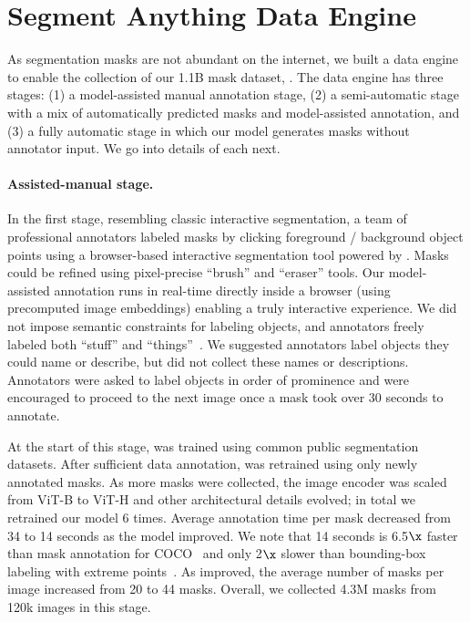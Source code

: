 \section{Segment Anything Data Engine}\label{sec:engine}

As segmentation masks are not abundant on the internet, we built a data engine to enable the collection of our 1.1B mask dataset, \sad. The data engine has three stages: (1) a model-assisted manual annotation stage, (2) a semi-automatic stage with a mix of automatically predicted masks and model-assisted annotation, and (3) a fully automatic stage in which our model generates masks without annotator input. We go into details of each next.

\paragraph{Assisted-manual stage.} In the first stage, resembling classic interactive segmentation, a team of professional annotators labeled masks by clicking foreground / background object points using a browser-based interactive segmentation tool powered by \sam. Masks could be refined using pixel-precise ``brush'' and ``eraser'' tools. Our model-assisted annotation runs in real-time directly inside a browser (using precomputed image embeddings) enabling a truly interactive experience. We did not impose semantic constraints for labeling objects, and annotators freely labeled both ``stuff'' and ``things''~\cite{adelson2001seeing}. We suggested annotators label objects they could name or describe, but did not collect these names or descriptions. Annotators were asked to label objects in order of prominence and were encouraged to proceed to the next image once a mask took over 30 seconds to annotate.

At the start of this stage, \sam was trained using common public segmentation datasets. After sufficient data annotation, \sam was retrained using only newly annotated masks. As more masks were collected, the image encoder was scaled from ViT-B to ViT-H and other architectural details evolved; in total we retrained our model 6 times. Average annotation time per mask decreased from 34 to 14 seconds as the model improved. We note that 14 seconds is 6.5$\x$ faster than mask annotation for COCO~\cite{Lin2014} and only 2$\x$ slower than bounding-box labeling with extreme points~\cite{papadopoulos2017extreme,maninis2018deep}. As \sam improved, the average number of masks per image increased from 20 to 44 masks. Overall, we collected 4.3M masks from 120k images in this stage.

